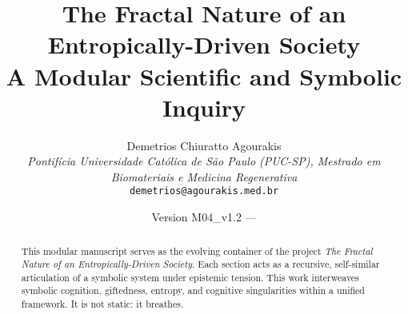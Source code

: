\documentclass[12pt]{article}
\title{\textbf{The Fractal Nature of an Entropically-Driven Society} \\ \large A Modular Scientific and Symbolic Inquiry}
\author{
Demetrios Chiuratto Agourakis\\
\textit{Pontifícia Universidade Católica de São Paulo (PUC-SP), Mestrado em Biomateriais e Medicina Regenerativa}\\
\texttt{demetrios@agourakis.med.br}
}
\date{Version M04\_v1.2 — \DTMnow}
\begin{document}
\maketitle


\begin{abstract}
This modular manuscript serves as the evolving container of the project \textit{The Fractal Nature of an Entropically-Driven Society}. Each section acts as a recursive, self-similar articulation of a symbolic system under epistemic tension. This work interweaves symbolic cognition, giftedness, entropy, and cognitive singularities within a unified framework. It is not static: it breathes.
\end{abstract}

\tableofcontents
\newpage




 
% 
% 
% 
% 



\end{document}
